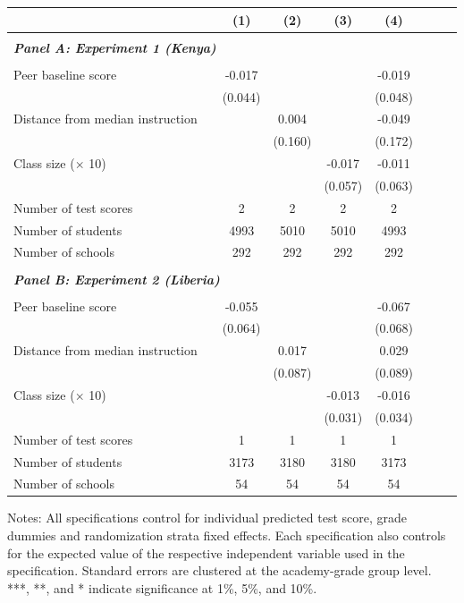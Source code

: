 \begin{center} 
\caption{\small Effect on test scores} 
\label{tab:descriptives} 
\begin{scriptsize}
\begin{threeparttable}
\begin{tabular} {@{} l l c c c c c c c  @{}} \toprule \toprule
& &(1)&(2)&(3)&(4) \\ \midrule 
\\
\multicolumn{3}{l}{\textbf{\textit{Panel A: Experiment 1 (Kenya)}}} \\
\\
Peer baseline score &  & -0.017 &  &  & -0.019 \\
                 &  & (0.044) &  &  & (0.048) \\
Distance from median instruction &  &  & 0.004 &  & -0.049 \\
                 &  &  & (0.160) &  & (0.172) \\
Class size ($\times$ 10) &  &  &  & -0.017 & -0.011 \\
                 &  &  &  & (0.057) & (0.063) \\
\midrule
Number of test scores &  & 2 & 2 & 2 & 2 \\
Number of students &  & 4993 & 5010 & 5010 & 4993 \\
Number of schools &  & 292 & 292 & 292 & 292 \\
 \midrule
\\
\multicolumn{3}{l}{\textbf{\textit{Panel B: Experiment 2 (Liberia)}}} \\
\\
Peer baseline score &  & -0.055 &  &  & -0.067 \\
                 &  & (0.064) &  &  & (0.068) \\
Distance from median instruction &  &  & 0.017 &  & 0.029 \\
                 &  &  & (0.087) &  & (0.089) \\
Class size ($\times$ 10) &  &  &  & -0.013 & -0.016 \\
                 &  &  &  & (0.031) & (0.034) \\
\midrule
Number of test scores &  & 1 & 1 & 1 & 1 \\
Number of students &  & 3173 & 3180 & 3180 & 3173 \\
Number of schools &  & 54 & 54 & 54 & 54 \\
\bottomrule
\end{tabular}
\begin{tablenotes}
\item Notes: All specifications control for individual predicted test score, grade dummies and randomization strata fixed effects. Each specification also controls for the expected value of the respective independent variable used in the specification. Standard errors are clustered at the academy-grade group level. ***, **, and * indicate significance at 1\%, 5\%, and 10\%.\end{tablenotes}
\end{threeparttable}
\end{scriptsize}
\end{center}
\clearpage
